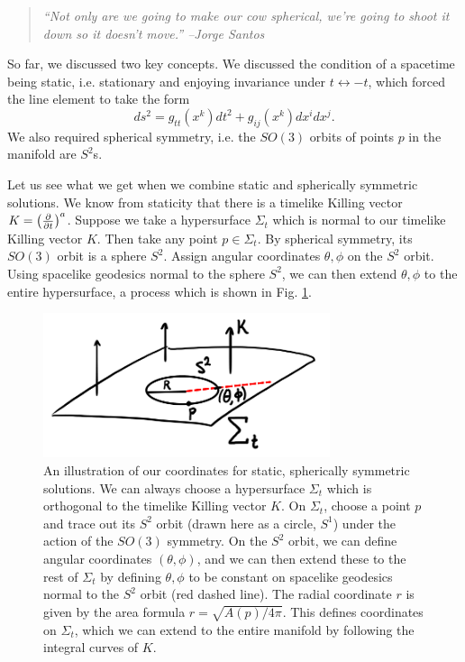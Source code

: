 \begin{quote}
    \textit{``Not only are we going to make our cow spherical, we're going to shoot it down so it doesn't move.'' --Jorge Santos}
\end{quote}

So far, we discussed two key concepts. We discussed the condition of a spacetime being static, i.e. stationary and enjoying invariance under $t\leftrightarrow -t$, which forced the line element to take the form
\begin{equation}
    ds^2 = g_{tt}(x^k)dt^2 + g_{ij}(x^k)dx^i dx^j.
\end{equation}
We also required spherical symmetry, i.e. the $SO(3)$ orbits of points $p$ in the manifold are $S^2$s.

Let us see what we get when we combine static and spherically symmetric solutions. We know from staticity that there is a timelike Killing vector $K=\left(\P{}{t}\right)^a$. Suppose we take a hypersurface $\Sigma_t$ which is normal to our timelike Killing vector $K$. Then take any point $p\in \Sigma_t$. By spherical symmetry, its $SO(3)$ orbit is a sphere $S^2$. Assign angular coordinates $\theta,\phi$ on the $S^2$ orbit. Using spacelike geodesics normal to the sphere $S^2$, we can then extend $\theta,\phi$ to the entire hypersurface, a process which is shown in Fig. \ref{fig:sphericalcoords}.

\begin{figure}
    \centering
    \includegraphics[width=0.75\textwidth]{2019/01/20190121_sphericalcoords.png}
    \caption{An illustration of our coordinates for static, spherically symmetric solutions. We can always choose a hypersurface $\Sigma_t$ which is orthogonal to the timelike Killing vector $K$. On $\Sigma_t$, choose a point $p$ and trace out its $S^2$ orbit (drawn here as a circle, $S^1$) under the action of the $SO(3)$ symmetry. On the $S^2$ orbit, we can define angular coordinates $(\theta,\phi)$, and we can then extend these to the rest of $\Sigma_t$ by defining $\theta,\phi$ to be constant on spacelike geodesics normal to the $S^2$ orbit (red dashed line). The radial coordinate $r$ is given by the area formula $r=\sqrt{A(p)/4\pi}.$ This defines coordinates on $\Sigma_t$, which we can extend to the entire manifold by following the integral curves of $K$.}
    \label{fig:sphericalcoords}
\end{figure}

